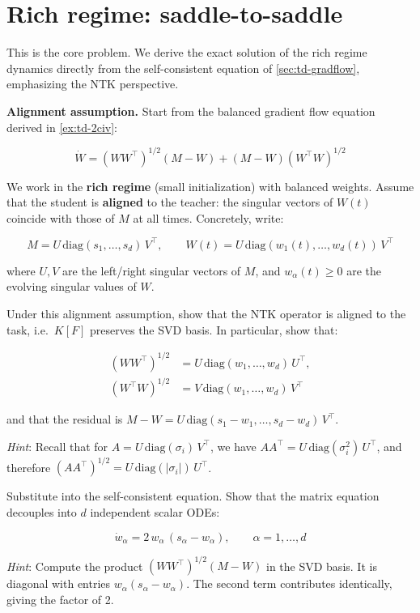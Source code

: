 \documentclass[11pt]{article}
\begin{document}
\section{Rich regime: saddle-to-saddle}
\label{sec:td-rich}

This is the core problem. We derive the exact solution of the rich
regime dynamics directly from the self-consistent equation of \cref{sec:td-gradflow},
emphasizing the NTK perspective.

\textbf{Alignment assumption.} Start from the balanced
gradient flow equation derived in \cref{ex:td-2civ}:

\[\dot{W} = (WW^\top)^{1/2}(M - W) + (M - W)(W^\top W)^{1/2}\]

We work in the \textbf{rich regime} (small initialization) with balanced
weights. Assume that the student is \textbf{aligned} to the teacher: the
singular vectors of \(W(t)\) coincide with those of \(M\) at all times.
Concretely, write:

\[M = U\,\text{diag}(s_1, \ldots, s_d)\,V^\top, \qquad W(t) = U\,\text{diag}(w_1(t), \ldots, w_d(t))\,V^\top\]

where \(U, V\) are the left/right singular vectors of \(M\), and
\(w_\alpha(t) \geq 0\) are the evolving singular values of \(W\).

\begin{exercise}
\label{ex:td-3ai}
Under this alignment assumption, show that the NTK
operator is aligned to the task, i.e.~\(K[F]\) preserves the SVD basis.
In particular, show that:

\begin{align*}
(WW^\top)^{1/2} &= U\,\text{diag}(w_1, \ldots, w_d)\,U^\top, \\
(W^\top W)^{1/2} &= V\,\text{diag}(w_1, \ldots, w_d)\,V^\top
\end{align*}

and that the residual is
\(M - W = U\,\text{diag}(s_1 - w_1, \ldots, s_d - w_d)\,V^\top\).

\emph{Hint}: Recall that for \(A = U\,\text{diag}(\sigma_i)\,V^\top\),
we have \(AA^\top = U\,\text{diag}(\sigma_i^2)\,U^\top\), and therefore
\((AA^\top)^{1/2} = U\,\text{diag}(|\sigma_i|)\,U^\top\).
\end{exercise}


\begin{exercise}
\label{ex:td-3aii}
Substitute into the self-consistent equation. Show that
the matrix equation decouples into \(d\) independent scalar ODEs:

\[\dot{w}_\alpha = 2\,w_\alpha\,(s_\alpha - w_\alpha), \qquad \alpha = 1, \ldots, d\]

\emph{Hint}: Compute the product \((WW^\top)^{1/2}(M - W)\) in the SVD
basis. It is diagonal with entries \(w_\alpha(s_\alpha - w_\alpha)\).
The second term contributes identically, giving the factor of 2.
\end{exercise}
\end{document}
